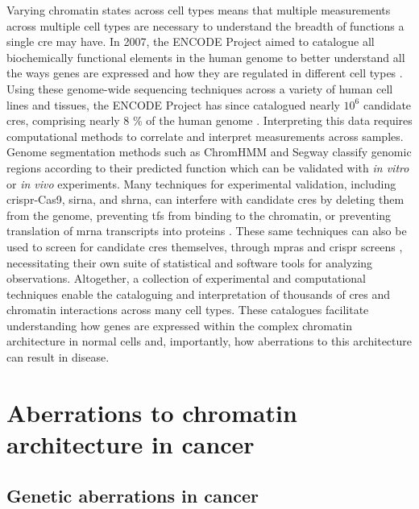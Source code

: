 Varying chromatin states across cell types means that multiple measurements across multiple cell types are necessary to understand the breadth of functions a single \gls{cre} may have.
In 2007, the ENCODE Project aimed to catalogue all biochemically functional elements in the human genome to better understand all the ways genes are expressed and how they are regulated in different cell types \cite{birneyIdentificationAnalysisFunctional2007,mooreExpandedEncyclopaediasDNA2020}.
Using these genome-wide sequencing techniques across a variety of human cell lines and tissues, the ENCODE Project has since catalogued nearly $10^6$ candidate \glspl{cre}, comprising nearly 8 \% of the human genome \cite{mooreExpandedEncyclopaediasDNA2020}.
Interpreting this data requires computational methods to correlate and interpret measurements across samples.
Genome segmentation methods such as ChromHMM \cite{ernstChromHMMAutomatingChromatinstate2012} and Segway \cite{hoffmanUnsupervisedPatternDiscovery2012,chanSegwayGaussianMixture2018}  classify genomic regions according to their predicted function which can be validated with \emph{in vitro} or \emph{in vivo} experiments.
Many techniques for experimental validation, including \gls{crispr}-Cas9, \gls{sirna}, and \gls{shrna}, can interfere with candidate \glspl{cre} by deleting them from the genome, preventing \glspl{tf} from binding to the chromatin, or preventing translation of \gls{mrna} transcripts into proteins \cite{zhouEmergenceNoncodingCancer2016,gasperiniComprehensiveCatalogueValidated2020}.
These same techniques can also be used to screen for candidate \glspl{cre} themselves, through \glspl{mpra} and \gls{crispr} screens \cite{gasperiniComprehensiveCatalogueValidated2020}, necessitating their own suite of statistical and software tools for analyzing observations.
Altogether, a collection of experimental and computational techniques enable the cataloguing and interpretation of thousands of \glspl{cre} and chromatin interactions across many cell types.
These catalogues facilitate understanding how genes are expressed within the complex chromatin architecture in normal cells and, importantly, how aberrations to this architecture can result in disease.

\section{Aberrations to chromatin architecture in cancer}

\subsection{Genetic aberrations in cancer}


